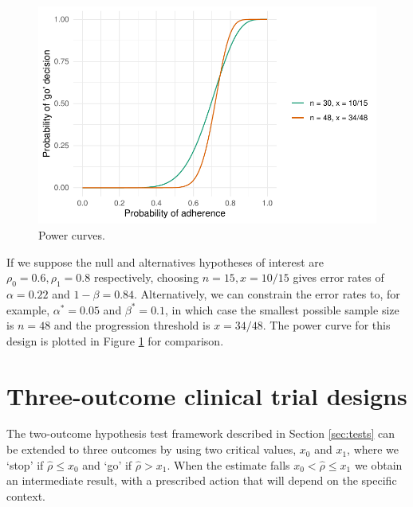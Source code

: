 \documentclass[Crown, times, sagev]{sagej}
\begin{document}
\begin{figure}
\centering
\includegraphics[scale=0.8]{./figures/power}
\caption{Power curves.}
\label{fig:power}
\end{figure}

If we suppose the null and alternatives hypotheses of interest are $\rho_0 = 0.6, \rho_1 = 0.8$ respectively, choosing $n = 15, x = 10/15$ gives error rates of $\alpha = 0.22$ and $1 - \beta = 0.84$. Alternatively, we can constrain the error rates to, for example, $\alpha^* = 0.05$ and $\beta^* = 0.1$, in which case the smallest possible sample size is $n = 48$ and the progression threshold is $x = 34/48$. The power curve for this design is plotted in Figure \ref{fig:power} for comparison. 

\section{Three-outcome clinical trial designs}\label{sec:review}

The two-outcome hypothesis test framework described in Section \ref{sec:tests} can be extended to three outcomes by using two critical values, $x_0$ and $x_1$, where we `stop' if $\hat{\rho} \leq x_0$ and `go' if $\hat{\rho} > x_1$. When the estimate falls $x_0 < \hat{\rho} \leq x_1$ we obtain an intermediate result, with a prescribed action that will depend on the specific context.
\end{document}
